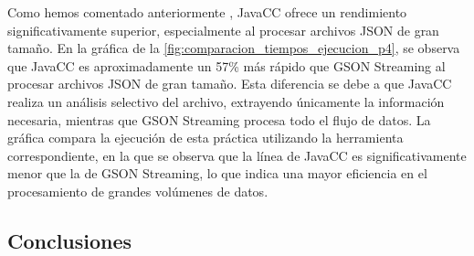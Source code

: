  

 Como 
hemos comentado anteriormente
, JavaCC ofrece un rendimiento significativamente superior, especialmente al procesar archivos JSON de gran tamaño.
 En la gráfica de la \autoref{fig:comparacion_tiempos_ejecucion_p4}, se observa que JavaCC es aproximadamente un 57\% más rápido que GSON Streaming al procesar archivos JSON de gran tamaño. Esta diferencia se debe a que JavaCC realiza un análisis selectivo del archivo, extrayendo únicamente la información necesaria, mientras que GSON Streaming procesa todo el flujo de datos. La gráfica compara la ejecución de esta práctica utilizando la herramienta correspondiente, en la que se observa %
 que la línea de JavaCC es significativamente menor que la de GSON Streaming, lo que indica una mayor eficiencia en el procesamiento de grandes volúmenes de datos.



\subsection{Conclusiones}



